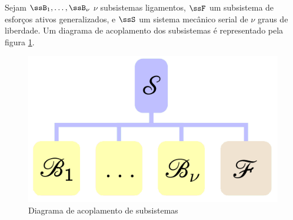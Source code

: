 \documentclass[]{politex}
\begin{document}
Sejam $\ssB_1,\hdots,\ssB_\nu$ $\nu$ subsistemas ligamentos, $\ssF$ um subsistema de esforços ativos generalizados, e $\ssS$ um sistema mecânico serial de $\nu$ graus de liberdade. Um diagrama de acoplamento dos subsistemas é representado pela figura \ref{fig:AcoplamentoMecSerial}.
\begin{figure}[H]
	\centering
	\includegraphics[scale=0.42]{imagens/DiagramaAcoplamentoMecSerial.png}  
	\caption{Diagrama de acoplamento de subsistemas}
	\label{fig:AcoplamentoMecSerial}
\end{figure}
\end{document}
